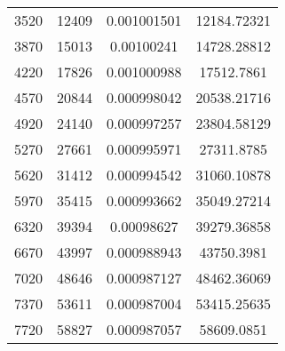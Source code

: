 \documentclass[a4paper,12pt]{article} %
\begin{document}
\begin{table}[H]
{\begin{tabular}{|c|c|c|c|}
			3520                                               & 12409                & 0.001001501              & 12184.72321                                          \\
			3870                                               & 15013                & 0.00100241               & 14728.28812                                          \\
			4220                                               & 17826                & 0.001000988              & 17512.7861                                           \\
			4570                                               & 20844                & 0.000998042              & 20538.21716                                          \\
			4920                                               & 24140                & 0.000997257              & 23804.58129                                          \\
			5270                                               & 27661                & 0.000995971              & 27311.8785                                           \\
			5620                                               & 31412                & 0.000994542              & 31060.10878                                          \\
			5970                                               & 35415                & 0.000993662              & 35049.27214                                          \\
			6320                                               & 39394                & 0.00098627               & 39279.36858                                          \\
			6670                                               & 43997                & 0.000988943              & 43750.3981                                           \\
			7020                                               & 48646                & 0.000987127              & 48462.36069                                          \\
			7370                                               & 53611                & 0.000987004              & 53415.25635                                          \\
			7720                                               & 58827                & 0.000987057              & 58609.0851                                           \\

\end{tabular}}
\end{table}
\end{document}
